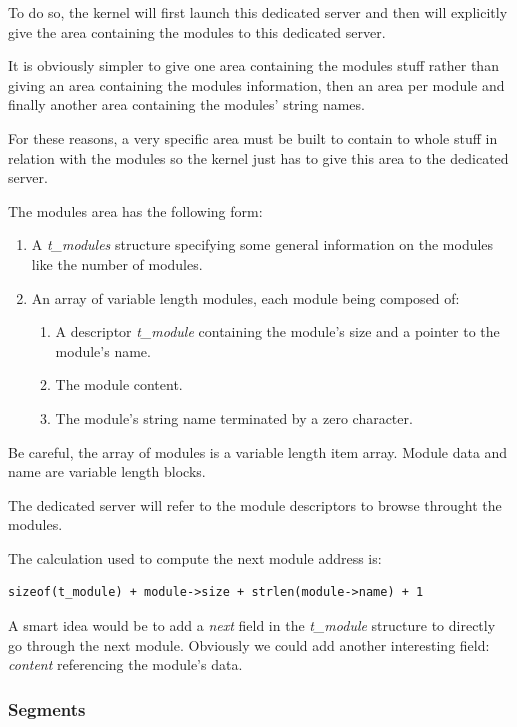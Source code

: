 To do so, the kernel will first launch this dedicated server and then
will explicitly give the area containing the modules to this dedicated
server.

It is obviously simpler to give one area containing the modules
stuff rather than giving an area containing the modules information, then
an area per module and finally another area containing the modules' string
names.

For these reasons, a very specific area must be built to contain
to whole stuff in relation with the modules so the kernel just has to
give this area to the dedicated server.

The modules area has the following form:

\begin{enumerate}
  \item
    A \textit{t\_modules} structure specifying some general information on
    the modules like the number of modules.
  \item
    An array of variable length modules, each module being composed of:

    \begin{enumerate}
      \item
	A descriptor \textit{t\_module} containing the module's size and
	a pointer to the module's name.
      \item
	The module content.
      \item
	The module's string name terminated by a zero character.
    \end{enumerate}
\end{enumerate}

Be careful, the array of modules is a variable length item array.
Module data and name are variable length blocks.

The dedicated server will refer to the module descriptors to browse
throught the modules.

The calculation used to compute the next module address is:

\begin{verbatim}
sizeof(t_module) + module->size + strlen(module->name) + 1
\end{verbatim}

A smart idea would be to add a \textit{next} field in the \textit{t\_module}
structure to directly go through the next module. Obviously we could
add another interesting field: \textit{content} referencing the module's data.

\subsubsection{Segments}

